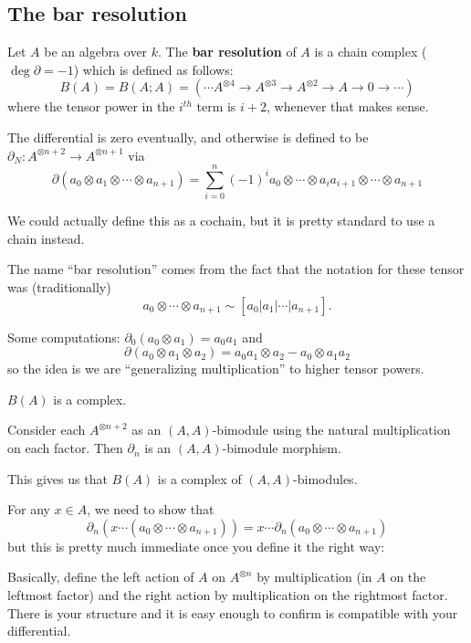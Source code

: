 \documentclass[12pt]{article}
\begin{document}
\subsection{The bar resolution}
\begin{defn}
Let $A$ be an algebra over $k$. The \textbf{bar resolution} of $A$ is a chain complex
($\deg\partial=-1$) which is defined as follows:
\[B(A)=B(A;A)=\left(\cdots A^{\otimes 4}\to A^{\otimes 3}\to A^{\otimes 2}\to A\to 0\to \cdots\right)\]
where the tensor power in the $i^{th}$ term is $i+2$, whenever that makes sense.

The differential is zero eventually, and otherwise is defined to be $\partial_N:A^{\otimes n+2}\to A^{\otimes n+1}$ via
\[\partial(a_0\otimes a_1\otimes \cdots\otimes a_{n+1})=\sum_{i=0}^n(-1)^ia_0\otimes\cdots\otimes a_ia_{i+1}\otimes\cdots\otimes a_{n+1}\]
\end{defn}
\begin{rmk}
	We could actually define this as a cochain, but it is pretty standard to use a chain instead.
\end{rmk}
\begin{rmk}
	The name ``bar resolution'' comes from the fact that the notation for these tensor was (traditionally)
	\[a_0\otimes\cdots\otimes a_{n+1}\sim[a_0|a_1|\cdots|a_{n+1}].\]
\end{rmk}
\begin{ex}
	Some computations: $\partial_0(a_0\otimes a_1)=a_0a_1$ and
	\[\partial(a_0\otimes a_1\otimes a_2)=a_0a_1\otimes a_2-a_0\otimes a_1a_2\]
	so the idea is we are ``generalizing multiplication'' to higher tensor powers.
\end{ex}
\begin{lem}
	$B(A)$ is a complex.
\end{lem}
\begin{lem}
	Consider each $A^{\otimes n+2}$ as an $(A,A)$-bimodule using the natural multiplication on each 
	factor. Then $\partial_n$ is an $(A,A)$-bimodule morphism.
\end{lem}
\begin{cor}
	This gives us that $B(A)$ is a complex of $(A,A)$-bimodules.
\end{cor}
\begin{prf}
	For any $x\in A$, we need to show that 
	\[\partial_n(x\cdots(a_0\otimes\cdots\otimes a_{n+1}))=x\cdots\partial_n(a_0\otimes\cdots\otimes a_{n+1})\]
	but this is pretty much immediate once you define it the right way:

	Basically, define the left action of $A$ on $A^{\otimes n}$ by multiplication (in $A$ on the leftmost factor)
	and the right action by multiplication on the rightmost factor. There is your structure and it is easy enough 
	to confirm is compatible with your differential.
\end{prf}
\end{document}
